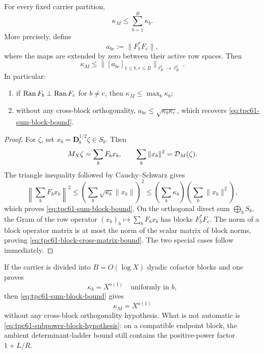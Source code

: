 \begin{theorem}
\label{thm:tpc61-block-upper}
For every fixed carrier partition,
\begin{equation}
 \boxed{\kappa_M\le\sum_{b=1}^{B}\kappa_b.}
 \label{eq:tpc61-sum-block-bound}
\end{equation}
More precisely, define
\begin{equation}
 a_{bc}:=\|F_b^*F_c\|,
 \label{eq:tpc61-block-cross-norm}
\end{equation}
where the maps are extended by zero between their active row spaces.  Then
\begin{equation}
 \boxed{
 \kappa_M\le
 \bigl\|[a_{bc}]_{1\le b,c\le B}\bigr\|_{\ell^2_B\to\ell^2_B}.}
 \label{eq:tpc61-block-cross-matrix-bound}
\end{equation}
In particular:
\begin{enumerate}[label=\textup{(\roman*)},leftmargin=3em]
 \item if \(\operatorname{Ran} F_b\perp\operatorname{Ran} F_c\) for \(b\ne c\), then
       \(\kappa_M\le\max_b\kappa_b\);
 \item without any cross-block orthogonality,
       \(a_{bc}\le\sqrt{\kappa_b\kappa_c}\), which recovers
       \eqref{eq:tpc61-sum-block-bound}.
\end{enumerate}
\end{theorem}

\begin{proof}
For \(\zeta\), set
\(x_b=\mathbf D_b^{1/2}\zeta\in S_b\).  Then
\[
 M_X\zeta=\sum_bF_bx_b,
 \qquad
 \sum_b\|x_b\|^2=\mathcal D_M(\zeta).
\]
The triangle inequality followed by Cauchy--Schwarz gives
\[
 \left\|\sum_bF_bx_b\right\|^2
 \le
 \left(\sum_b\sqrt{\kappa_b}\|x_b\|\right)^2
 \le
 \left(\sum_b\kappa_b\right)
 \left(\sum_b\|x_b\|^2\right),
\]
which proves \eqref{eq:tpc61-sum-block-bound}.  On the orthogonal direct
sum \(\bigoplus_bS_b\), the Gram of the row operator
\((x_b)_b\mapsto\sum_bF_bx_b\) has blocks \(F_b^*F_c\).  The norm of a
block operator matrix is at most the norm of the scalar matrix of block
norms, proving \eqref{eq:tpc61-block-cross-matrix-bound}.  The two special
cases follow immediately.
\end{proof}

If the carrier is divided into \(B=O(\log X)\) dyadic cofactor blocks and
one proves
\begin{equation}
 \kappa_b=X^{o(1)}
 \quad\text{uniformly in }b,
 \label{eq:tpc61-subpower-block-hypothesis}
\end{equation}
then \eqref{eq:tpc61-sum-block-bound} gives
\begin{equation}
 \boxed{\kappa_M=X^{o(1)}}
 \label{eq:tpc61-subpower-global-kappa}
\end{equation}
without any cross-block orthogonality hypothesis.  What is not automatic
is \eqref{eq:tpc61-subpower-block-hypothesis}: on a compatible endpoint
block, the ambient determinant-ladder bound still contains the
positive-power factor \(1+L/R\).

